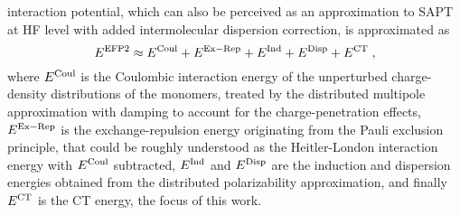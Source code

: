 \documentclass[aip,jcp,amsmath,amssymb,reprint,floatfix]{revtex4-1}
\begin{document}
interaction potential, which can also be perceived as an approximation
to SAPT at HF level with added intermolecular dispersion correction, is approximated as 
%
\begin{equation}\label{e:u-efp2}
 E^{\rm EFP2} \approx E^{\rm Coul} + E^{\rm Ex-Rep} + E^{\rm Ind} + E^{\rm Disp} + E^{\rm CT} \;,
\end{equation}
%
where $E^{\rm Coul}$ is the Coulombic interaction energy of the unperturbed charge\hyp{}density
distributions of the monomers, treated by the distributed multipole approximation
with damping to account for the charge\hyp{}penetration effects,\cite{Slipchenko.Gordon.JCC.2007}
$E^{\rm Ex-Rep}$ is the exchange\hyp{}repulsion energy originating from the Pauli exclusion
principle,\cite{Jensen.Gordon.MolPhys.1996,Jensen.Gordon.JCP.1998} 
that could be roughly understood as the Heitler\hyp{}London interaction
energy\cite{Chalasinski.Gutowski.MolPhys.1985} with $E^{\rm Coul}$ subtracted, $E^{\rm Ind}$ and $E^{\rm Disp}$
are the induction and dispersion energies obtained from the distributed polarizability
approximation,\cite{Li.Netzloff.Gordon.JCP.2006,Adamovic.Gordon.MolPhys.2005,Xu.Zahariev.Gordon.JCTC.2014} 
and finally $E^{\rm CT}$ is the CT energy,\cite{Li.Gordon.Jensen.JCP.2006,Xu.Gordon.JCP.2013} 
the focus of this work.
\end{document}
